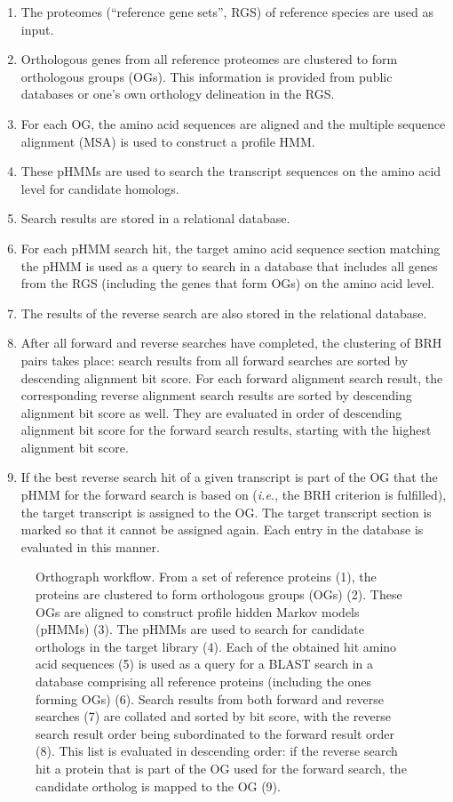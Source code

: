 \begin{enumerate}
\item
  The proteomes (``reference gene sets'', RGS) of reference species are
  used as input.
\item
  Orthologous genes from all reference proteomes are clustered to form
  orthologous groups (OGs). This information is provided from public
  databases or one's own orthology delineation in the RGS.
\item
  For each OG, the amino acid sequences are aligned and the multiple
  sequence alignment (MSA) is used to construct a profile HMM.
\item
  These pHMMs are used to search the transcript sequences on the amino
  acid level for candidate homologs.
\item
  Search results are stored in a relational database.
\item
  For each pHMM search hit, the target amino acid sequence section
  matching the pHMM is used as a query to search in a database that
  includes all genes from the RGS (including the genes that form OGs) on
  the amino acid level.
\item
  The results of the reverse search are also stored in the relational
  database.
\item
  After all forward and reverse searches have completed, the clustering
  of BRH pairs takes place: search results from all forward searches are
  sorted by descending alignment bit score. For each forward alignment
  search result, the corresponding reverse alignment search results are
  sorted by descending alignment bit score as well. They are evaluated
  in order of descending alignment bit score for the forward search
  results, starting with the highest alignment bit score.
\item
  If the best reverse search hit of a given transcript is part of the OG
  that the pHMM for the forward search is based on (\emph{i.e.}, the BRH
  criterion is fulfilled), the target transcript is assigned to the OG.
  The target transcript section is marked so that it cannot be assigned
  again. Each entry in the database is evaluated in this manner.
\end{enumerate}

\begin{figure}[h!]
\caption[Orthograph workflow]{Orthograph workflow. From a set of
	reference proteins (1), the proteins are clustered to form orthologous groups
	(OGs) (2). These OGs are aligned to construct profile hidden Markov models
	(pHMMs) (3). The pHMMs are used to search for candidate orthologs in the
	target library (4). Each of the obtained hit amino acid sequences (5) is used
	as a query for a BLAST search in a database comprising all reference proteins
	(including the ones forming OGs) (6). Search results from both forward and
	reverse searches (7) are collated and sorted by bit score, with the reverse
	search result order being subordinated to the forward result order (8). This
	list is evaluated in descending order: if the reverse search hit a protein
	that is part of the OG used for the forward search, the candidate ortholog is
	mapped to the OG (9).}
\end{figure}


